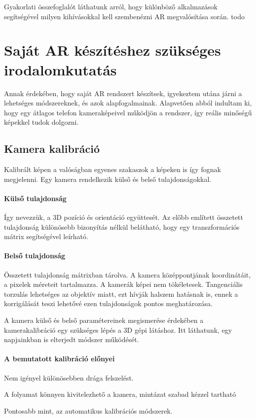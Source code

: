 \documentclass[12pt,a4paper,oneside]{report} %
\begin{document}
Gyakorlati \cite{prochazka2011augmented} összefoglalót láthatunk  arról, hogy különböző alkalmazások segítségével milyen kihívásokkal kell szembenézni AR megvalósítása során. 
todo
\section{Saját AR készítéshez szükséges irodalomkutatás}
Annak érdekében, hogy saját AR rendszert készítsek, igyekeztem utána járni a lehetséges módszereknek, és azok alapfogalmainak.
Alapvetően abból indultam ki, hogy egy átlagos telefon kameraképeivel működjön a rendszer, így reális minőségű képekkel tudok dolgozni.
\subsection{Kamera kalibráció}
Kalibrált képen a valóságban egyenes szakaszok a képeken is így fognak megjelenni. Egy kamera rendelkezik külső és belső tulajdonságokkal. 
\paragraph{Külső tulajdonság} Így nevezzük, a 3D pozíció és  orientáció együttesét. Az előbb említett összetett  tulajdonság különösebb bizonyítás nélkül belátható, hogy egy transzformációs mátrix segítségével leírható.
\paragraph{Belső tulajdonság} 
Összetett tulajdonság mátrixban tárolva. A kamera középpontjának koordinátáit, a pixelek méreteit tartalmazza.  A kamerák képei nem tökéletesek. Tangenciális torzulás lehetséges az objektív miatt, ezt hívják halszem hatásnak is, ennek a korrigálását teszi lehetővé ezen tulajdonságok pontos meghatározása. 
\par  A kamera külső és belső paramétereinek megismerése érdekében a kamerakalibráció egy szükséges lépés a 3D gépi látáshoz. Itt \cite{zhang1999flexible} láthatunk, egy  napjainkban is elterjedt módszer működését.
\paragraph{A bemutatott kalibráció előnyei} 
\begin{compactitem}
	\item Nem igényel különösebben drága felszelést. 
	\item A folyamat könnyen kivitelezhető a kamera, mintázat szabad kézzel tartható 
	\item Pontosabb mint, az automatikus kalibrációs módszerek.
\end{compactitem}
\end{document}
